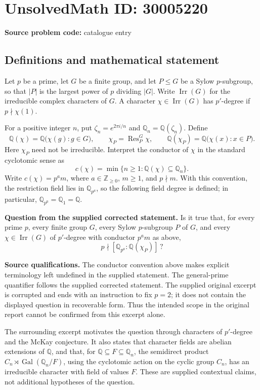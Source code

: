 \documentclass[11pt]{article}
\newcommand{\Z}{\mathbb{Z}}
\newcommand{\Q}{\mathbb{Q}}
\begin{document}
\section*{UnsolvedMath ID: 30005220}
\textbf{Source problem code:} catalogue entry
\subsection{Definitions and mathematical statement}
Let \(p\) be a prime, let \(G\) be a finite group, and let \(P\leq G\) be a Sylow \(p\)-subgroup, so that \(|P|\) is the largest power of \(p\) dividing \(|G|\). Write \(\operatorname{Irr}(G)\) for the irreducible complex characters of \(G\). A character \(\chi\in\operatorname{Irr}(G)\) has \(p'\)-degree if \(p\nmid\chi(1)\).

For a positive integer \(n\), put \(\zeta_n=e^{2\pi i/n}\) and \(\Q_n=\Q(\zeta_n)\). Define
\[
\Q(\chi)=\Q\bigl(\chi(g):g\in G\bigr),\qquad
\chi_P=\operatorname{Res}^{G}_{P}\chi,\qquad
\Q(\chi_P)=\Q\bigl(\chi(x):x\in P\bigr).
\]
Here \(\chi_P\) need not be irreducible. Interpret the conductor of \(\chi\) in the standard cyclotomic sense as
\[
c(\chi)=\min\{n\geq1:\Q(\chi)\subseteq\Q_n\}.
\]
Write \(c(\chi)=p^a m\), where \(a\in\Z_{\geq0}\), \(m\geq1\), and \(p\nmid m\). With this convention, the restriction field lies in \(\Q_{p^a}\), so the following field degree is defined; in particular, \(\Q_{p^0}=\Q_1=\Q\).

\textbf{Question from the supplied corrected statement.} Is it true that, for every prime \(p\), every finite group \(G\), every Sylow \(p\)-subgroup \(P\) of \(G\), and every \(\chi\in\operatorname{Irr}(G)\) of \(p'\)-degree with conductor \(p^a m\) as above,
\[
p\nmid[\Q_{p^a}:\Q(\chi_P)]\,?
\]

\textbf{Source qualifications.} The conductor convention above makes explicit terminology left undefined in the supplied statement. The general-prime quantifier follows the supplied corrected statement. The supplied original excerpt is corrupted and ends with an instruction to fix \(p=2\); it does not contain the displayed question in recoverable form. Thus the intended scope in the original report cannot be confirmed from this excerpt alone.

The surrounding excerpt motivates the question through characters of \(p'\)-degree and the McKay conjecture. It also states that character fields are abelian extensions of \(\Q\), and that, for \(\Q\subseteq F\subseteq\Q_n\), the semidirect product \(C_n\rtimes\operatorname{Gal}(\Q_n/F)\), using the cyclotomic action on the cyclic group \(C_n\), has an irreducible character with field of values \(F\). These are supplied contextual claims, not additional hypotheses of the question.
\end{document}
